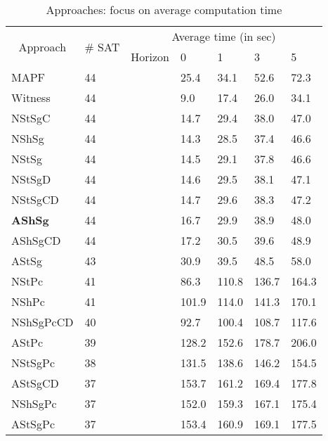 \begin{table}[H]
\begin{center}
\caption{Approaches: focus on average computation time}
\label{tbl:path_computation_time}
\begin{tabular}{@{}lllllll@{}}
\toprule
 \multicolumn{1}{c}{\multirow{2}{*}{Approach}} & \multirow{2}{*}{\# SAT} & \multicolumn{5}{c}{Average time (in sec)} \\ \cmidrule(l){3-7}  
\multicolumn{1}{c}{} &  & \multicolumn{1}{l|}{Horizon} & 0 & 1 & 3 & 5 \\ \midrule
MAPF & 44 & \cellcolor{lightgrey} & 25.4 & 34.1 & 52.6 & 72.3  \\
Witness & 44 & \cellcolor{lightgrey} & 9.0 & 17.4 & 26.0 & 34.1  \\
NStSgC & 44 & \cellcolor{lightgrey} & 14.7 & 29.4 & 38.0 & 47.0  \\
NShSg & 44 & \cellcolor{lightgrey} & 14.3 & 28.5 & 37.4 & 46.6  \\
NStSg & 44 & \cellcolor{lightgrey} & 14.5 & 29.1 & 37.8 & 46.6  \\
NStSgD & 44 & \cellcolor{lightgrey} & 14.6 & 29.5 & 38.1 & 47.1  \\
NStSgCD & 44 & \cellcolor{lightgrey} & 14.7 & 29.6 & 38.3 & 47.2  \\
\textbf{AShSg} & 44 & \cellcolor{lightgrey} & 16.7 & 29.9 & 38.9 & 48.0  \\
AShSgCD & 44 & \cellcolor{lightgrey} & 17.2 & 30.5 & 39.6 & 48.9  \\
AStSg & 43 & \cellcolor{lightgrey} & 30.9 & 39.5 & 48.5 & 58.0  \\
NStPc & 41 & \cellcolor{lightgrey} & 86.3 & 110.8 & 136.7 & 164.3  \\
NShPc & 41 & \cellcolor{lightgrey} & 101.9 & 114.0 & 141.3 & 170.1  \\
NShSgPcCD & 40 & \cellcolor{lightgrey} & 92.7 & 100.4 & 108.7 & 117.6  \\
AStPc & 39 & \cellcolor{lightgrey} & 128.2 & 152.6 & 178.7 & 206.0  \\
NStSgPc & 38 & \cellcolor{lightgrey} & 131.5 & 138.6 & 146.2 & 154.5  \\
AStSgCD & 37 & \cellcolor{lightgrey} & 153.7 & 161.2 & 169.4 & 177.8  \\
NShSgPc & 37 & \cellcolor{lightgrey} & 152.0 & 159.3 & 167.1 & 175.4  \\
AStSgPc & 37 & \cellcolor{lightgrey} & 153.4 & 160.9 & 169.1 & 177.5  \\
\end{tabular}
\end{center}
\end{table}
